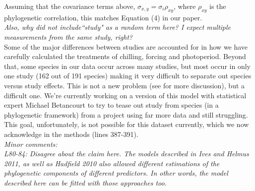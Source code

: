 \documentclass[11pt]{article}
\begin{document}
Assuming that the covariance terms above, $\sigma_{x,y}=\sigma_i \rho_{xy}$, where $\rho_{xy}$ is the phylogenetic correlation, this matches Equation (4) in our paper.\\

\emph{Also, why did not include``study" as a random term here? I expect multiple measurements from the same study, right?}\\

Some of the major differences between studies are accounted for in how we have carefully calculated the treatments of chilling, forcing and photoperiod. Beyond that, some species in our data occur across many studies, but most occur in only one study (162 out of 191 species) making it very difficult to separate out species versus study effects. This is not a new problem (see \citet{kharouba2018} for more discussion), but a difficult one. We're currently working on a version of this model with statistical expert Michael Betancourt to try to tease out study from species (in a phylogenetic framework) from a project using far more data and still struggling. This goal, unfortunately, is not possible for this dataset currently, which we now acknowledge in the methods (lines 387-391). \\ %



\emph{Minor comments:}\\
\emph{L80-84: Disagree about the claim here. The models described in Ives and Helmus 2011, as well as Hadfield 2010 also allowed different estimations of the phylogenetic components of different predictors. In other words, the model described here can be fitted with those approaches too.}\\ %
\end{document}
